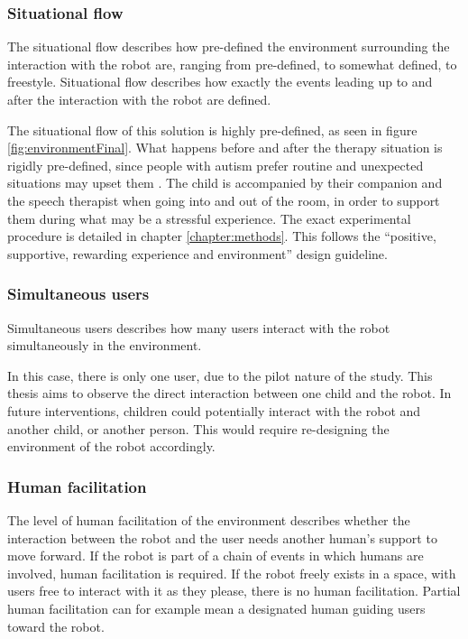 \subsubsection{Situational flow}

The situational flow describes how pre-defined the environment surrounding the interaction with the robot are, ranging from pre-defined, to somewhat defined, to freestyle. Situational flow describes how exactly the events leading up to and after the interaction with the robot are defined.

The situational flow of this solution is highly pre-defined, as seen in figure \ref{fig:environmentFinal}. What happens before and after the therapy situation is rigidly pre-defined, since people with autism prefer routine and unexpected situations may upset them \cite{frith2003autism, tetzchner}. The child is accompanied by their companion and the speech therapist when going into and out of the room, in order to support them during what may be a stressful experience. The exact experimental procedure is detailed in chapter \ref{chapter:methods}. This follows the ``positive, supportive, rewarding experience and environment'' design guideline.


\subsubsection{Simultaneous users}

Simultaneous users describes how many users interact with the robot simultaneously in the environment.

In this case, there is only one user, due to the pilot nature of the study. This thesis aims to observe the direct interaction between one child and the robot. In future interventions, children could potentially interact with the robot and another child, or another person. This would require re-designing the environment of the robot accordingly.


\subsubsection{Human facilitation}

The level of human facilitation of the environment describes whether the interaction between the robot and the user needs another human's support to move forward. If the robot is part of a chain of events in which humans are involved, human facilitation is required. If the robot freely exists in a space, with users free to interact with it as they please, there is no human facilitation. Partial human facilitation can for example mean a designated human guiding users toward the robot.

